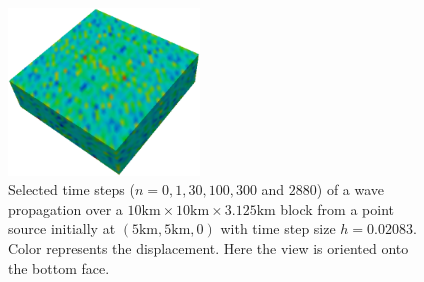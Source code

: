 \begin{figure}[t]
\begin{center}
\includegraphics[width=2in]{figures/Wavet288}
\end{center}
\caption{Selected time steps ($n = 0,1,30,100,300$ and $2880$) of a wave propagation over a $10\mbox{km} \times 10\mbox{km} \times 3.125\mbox{km}$ block 
from a point source initially at $(5\mbox{km},5\mbox{km},0)$
with time step size $h=0.02083$. Color represents the displacement.
Here the view is oriented onto the bottom face.
\label{WAVE FIG 2}}
\end{figure}
